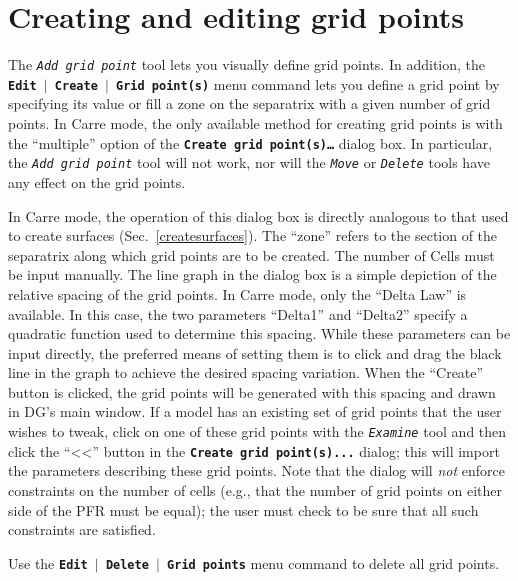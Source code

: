 \documentclass[12pt]{report}
\begin{document}
\section{Creating and editing grid points}

The \textit{\texttt{Add grid point}} tool lets you visually define
grid points. In addition, the
\textbf{\texttt{Edit  \begin{math}\vert{}\end{math}  Create  \begin{math}\vert{}\end{math}  Grid
point(s)}} menu command lets you define a grid point by specifying its
value or fill a zone on the separatrix with a given number of grid
points.  
In Carre mode, the only available method for creating grid points 
is with the ``multiple'' option of the 
\textbf{\texttt{Create grid point(s)\ldots}}
dialog box.  In particular, the \textit{\texttt{Add grid point}} tool
will not work, nor will the \textit{\texttt{Move}} or
\textit{\texttt{Delete}} tools have any
effect on the grid points.

In Carre mode, the operation of this dialog box is directly
analogous to that used to create surfaces (Sec.~\ref{createsurfaces}).
The ``zone'' refers to the section of the separatrix along which
grid points are to be created.
The number
of Cells must be input manually.  The line graph in the dialog box is a
simple depiction of the relative spacing of the grid points.  In Carre mode,
only the ``Delta Law'' is available.  In this case, the two parameters
``Delta1'' and ``Delta2'' specify a quadratic function used to determine
this spacing.  While these parameters can be input directly, the preferred
means of setting them is to click and drag the black line in the graph to
achieve the desired spacing variation.  When the ``Create'' button is
clicked, the grid points will be generated with this spacing and drawn in 
DG's main window.  If a model has an existing set of grid points that the
user wishes to tweak, click on one 
of these grid points with the \textit{\texttt{Examine}} tool and then
click the ``<<'' button in the \textbf{\texttt{Create grid point(s)...}} 
dialog; this will
import the parameters describing these grid points.
Note that the dialog will {\em not} enforce constraints on the number of
cells (e.g., that the number of grid points on either side of the
PFR must be equal); the
user must check to be sure that all such constraints are satisfied.

Use the
\textbf{\texttt{Edit  \begin{math}\vert{}\end{math}  Delete  \begin{math}\vert{}\end{math}  Grid
points}} menu command to delete all grid points.
\end{document}
